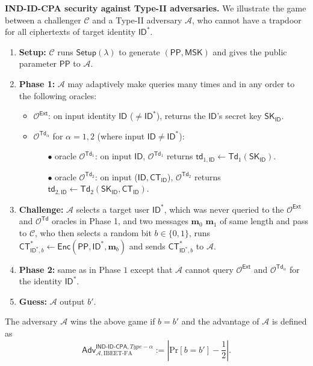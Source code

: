 \documentclass[runningheads,10pt]{llncs}
\def\cal{\mathcal}
\def\bf{\mathbf}
\def\SK{\mathsf{SK}}
\def\PP{\mathsf{PP}}
\def\MSK{\mathsf{MSK}}
\def\CT{\mathsf{CT}}
\def\td{\mathsf{td}}
\def\Setup{\mathsf{Setup}}
\def\Enc{\mathsf{Enc}}
\def\Ext{\mathsf{Ext}}
\def\Td{\mathsf{Td}}
\def\Pr{\mathrm{Pr}}
\def\Adv{\mathsf{Adv}}
\def\IND{\textsf{IND-ID-CPA}}
\def\ID{\mathsf{ID}}
\begin{document}
\noindent\textbf{IND-ID-CPA security against Type-II adversaries.}
We illustrate the game between a challenger $\cal{C}$ and a Type-II adversary $\cal{A}$, who cannot have a trapdoor for all ciphertexts of target identity $\ID^*$.
\begin{enumerate}
	\item \textbf{Setup:} $\cal{C}$ runs $\Setup(\lambda)$ to generate $(\PP,\MSK)$ and gives the public parameter $\PP$ to $\cal{A}$.
	\item \textbf{Phase 1:} $\cal{A}$ may adaptively make queries many times and in any order to the following oracles:
	\begin{itemize}
		\item $\cal{O}^{\Ext}$: on input identity $\ID$ ($\ne \ID^*$), returns the $\ID$'s secret key $\SK_{\ID}$.
		\item $\cal{O}^{\Td_\alpha}$ for $\alpha = 1, 2$ (where input $\ID \ne \ID^*$):
		\begin{itemize}
			\item[$\bullet$] oracle $\cal{O}^{\Td_1}$: on input $\ID$, $\cal{O}^{\Td_1}$ returns $\td_{1, \ID}\gets\Td_1(\SK_{\ID})$.
			\item[$\bullet$] oracle $\cal{O}^{\Td_2}$: on input ($\ID, \CT_{\ID}$), $\cal{O}^{\Td_2}$ returns $\td_{2, \ID}\gets\Td_2(\SK_{\ID}, \CT_{\ID})$.
		\end{itemize}
	\end{itemize}
	
	\item \textbf{Challenge:} $\cal{A}$ selects a target user $\ID^*$, which was never queried to the $\cal{O}^{\Ext}$ and  $\cal{O}^\Td$ oracles in Phase 1, and two messages $\bf{m}_0$ $\bf{m}_1$ of same length and pass to $\cal{C}$, who then selects a random bit $b\in\{0,1\}$, runs $\CT^*_{\ID^*, b}\gets\Enc(\PP,\ID^*,\bf{m}_b)$ and sends $\CT^*_{\ID^*,b}$ to $\cal{A}$.
	
	
	\item \textbf{Phase 2:} same as in Phase $1$ except that $\cal{A}$ cannot query $\cal{O}^{\Ext}$ and $\cal{O}^{\Td_\alpha}$ for the identity $\ID^*$.
	\item \textbf{Guess:} $\cal{A}$ output $b'$.
\end{enumerate}
The adversary $\cal{A}$ wins the above game if $b=b'$ and the advantage of $\cal{A}$ is defined as
$$\Adv_{\cal{A},\text{IBEET-FA}}^{\IND, Type-\alpha}:=\left|\Pr[b=b']-\frac{1}{2}\right|.$$
\end{document}
